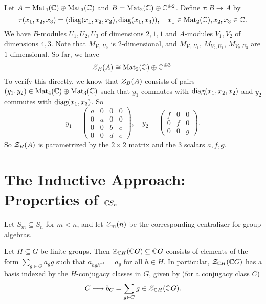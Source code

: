 \begin{example}
  Let $A = \operatorname{Mat}_4(\mathbb{C}) \oplus \operatorname{Mat}_3(\mathbb{C})$
  and $B = \operatorname{Mat}_2(\mathbb{C}) \oplus \mathbb{C}^{\oplus 2}$.
  Define $\tau : B \to A$ by
  \[
    \tau(x_1, x_2, x_3)
    = (\operatorname{diag}(x_1, x_2, x_2), \operatorname{diag}(x_1, x_3)), \quad
    x_1 \in \operatorname{Mat}_2(\mathbb{C}), x_2, x_3 \in \mathbb{C}.
  \]
  We have $B$-modules
  $U_1, U_2, U_3$ of dimensions
  $2, 1, 1$ and $A$-modules
  $V_1, V_2$ of dimensions $4, 3$. Note
  that $M_{V_1, U_2}$ is $2$-dimensional,
  and $M_{V_1, U_1}$, $M_{V_2, U_1}$,
  $M_{V_2, U_3}$ are $1$-dimensional.
  So far, we have
  \[
    \mathcal{Z}_B(A) \cong \operatorname{Mat}_2(\mathbb{C}) \oplus \mathbb{C}^{\oplus 3}.
  \]
  To verify this directly, we know that
  $\mathcal{Z}_B(A)$ consists of pairs
  $(y_1, y_2) \in \operatorname{Mat}_4(\mathbb{C}) \oplus \operatorname{Mat}_3(\mathbb{C})$
  such that $y_1$ commutes with
  $\operatorname{diag}(x_1, x_2, x_2)$ and $y_2$
  commutes with $\operatorname{diag}(x_1, x_3)$. So
  \[
    y_1 =
    \begin{pmatrix}
      a & 0 & 0 & 0 \\
      0 & a & 0 & 0 \\
      0 & 0 & b & c \\
      0 & 0 & d & e
    \end{pmatrix}, \quad
    y_2 =
    \begin{pmatrix}
      f & 0 & 0 \\
      0 & f & 0 \\
      0 & 0 & g
    \end{pmatrix}.
  \]
  So $\mathcal{Z}_B(A)$ is parametrized by the
  $2 \times 2$ matrix and the $3$ scalars
  $a, f, g$.
\end{example}

\section{The Inductive Approach: Properties of \texorpdfstring{$\mathbb{C} S_n$}{CSn}}

\begin{remark}
  Let $S_m \subseteq S_n$ for
  $m < n$, and let
  $\mathcal{Z}_m(n)$ be the corresponding
  centralizer for group algebras.
\end{remark}

\begin{lemma}
  Let $H \subseteq G$ be finite groups.
  Then $\mathbb{Z}_{\mathbb{C} H}(\mathbb{C} G) \subseteq \mathbb{C} G$
  consists of elements of the form
  $\sum_{g \in G} a_g g$ such that
  $a_{h g h^{-1}} = a_g$ for all
  $h \in H$. In particular,
  $\mathcal{Z}_{\mathbb{C} H}(\mathbb{C} G)$ has a basis indexed
  by the $H$-conjugacy classes in $G$,
  given by (for a conjugacy class $C$)
  \[
    C \longmapsto b_C =
    \sum_{g \in C} g \in \mathcal{Z}_{\mathbb{C} H}(\mathbb{C} G).
  \]
\end{lemma}

